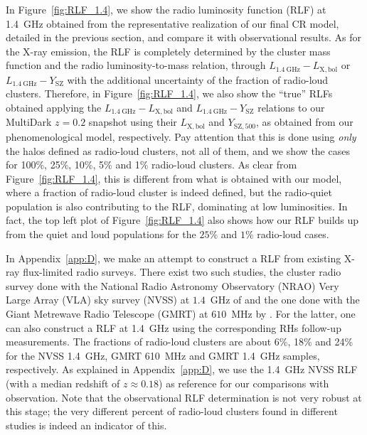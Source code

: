 \documentclass[traditabstract]{aa}
\newcommand{\rmn}{\mathrm}
\begin{document}
In Figure~\ref{fig:RLF_1.4}, we show the radio luminosity function (RLF) at 1.4~GHz obtained from the representative realization of our final CR model, detailed in the previous section, and compare it with observational results. As for the X-ray emission, the RLF is completely determined by the cluster mass function and the radio luminosity-to-mass relation, through $L_{1.4~\rmn{GHz}}-L_{ \rmn{X,bol}}$ or $L_{1.4~\rmn{GHz}}-Y_{\rmn{SZ}}$ with the additional uncertainty of the fraction of radio-loud clusters. Therefore, in Figure~\ref{fig:RLF_1.4}, we also show the ``true'' RLFs obtained applying  the $L_{1.4~\rmn{GHz}}-L_{\rmn{X,bol}}$ and $L_{1.4~\rmn{GHz}}-Y_{\rmn{SZ}}$ relations to our MultiDark $z = 0.2$ snapshot using their $L_{\rmn{X,bol}}$ and $Y_{\rmn{SZ}, 500}$, as obtained from our phenomenological model, respectively. Pay attention that this is done using \emph{only} the halos defined as radio-loud clusters, not all of them, and we show the cases for 100\%, 25\%, 10\%, 5\% and 1\% radio-loud clusters. As clear from Figure~\ref{fig:RLF_1.4}, this is different from what is obtained with our model, where a fraction of radio-loud cluster is indeed defined, but the radio-quiet population is also contributing to the RLF, dominating at low luminosities. In fact, the top left plot of Figure~\ref{fig:RLF_1.4} also shows how our RLF builds up from the quiet and loud populations for the $25\%$ and $1\%$ radio-loud cases.

In Appendix~\ref{app:D}, we make an attempt to construct a RLF from existing X-ray flux-limited radio surveys. There exist two such studies, the cluster radio survey done with the National Radio Astronomy Observatory (NRAO) Very Large Array (VLA) sky survey (NVSS) at $1.4$~GHz of \cite{1999NewA....4..141G} and the one done with the Giant Metrewave Radio Telescope (GMRT) at $610$~MHz by \cite{VenturiGMRT_1,VenturiGMRT_2}. For the latter, one can also construct a RLF at 1.4~GHz using the corresponding RHs follow-up measurements. The fractions of radio-loud clusters are about 6\%, 18\% and 24\% for the NVSS 1.4~GHz, GMRT 610~MHz and GMRT 1.4~GHz samples, respectively. As explained in Appendix~\ref{app:D}, we use the 1.4~GHz NVSS RLF (with a median redshift of $z \approx 0.18$) as reference for our comparisons with observation. Note that the observational RLF determination is not very robust at this stage; the very different percent of radio-loud clusters found in different studies is indeed 
an indicator of this.
 
\end{document}
